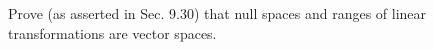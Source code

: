 \begin{exercise}
	Prove (as asserted in Sec. 9.30) that null spaces and ranges of linear transformations are vector spaces.
\end{exercise}

